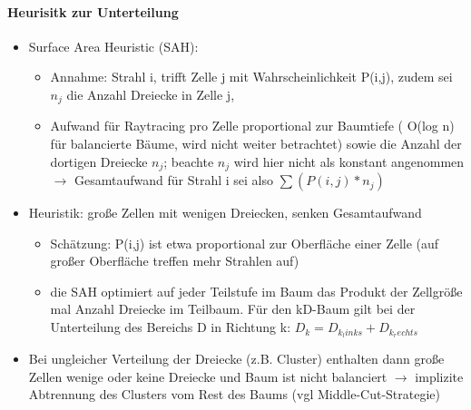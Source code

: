 \documentclass[10pt,landscape]{article}
\begin{document}
\begin{multicols}{3}
\paragraph*{Heurisitk zur Unterteilung}
\begin{itemize}
  \item Surface Area Heuristic (SAH):
        \begin{itemize}
          \item Annahme: Strahl i, trifft Zelle j mit Wahrscheinlichkeit P(i,j), zudem sei $n_j$ die Anzahl Dreiecke in Zelle j,
          \item Aufwand für Raytracing pro Zelle proportional zur Baumtiefe ( O(log n) für balancierte Bäume, wird nicht weiter betrachtet) sowie die Anzahl der dortigen Dreiecke $n_j$; beachte $n_j$ wird hier nicht als konstant angenommen $\rightarrow$ Gesamtaufwand für Strahl i sei also $\sum(P(i,j)*n_j)$
        \end{itemize}
  \item Heuristik: große Zellen mit wenigen Dreiecken, senken Gesamtaufwand
        \begin{itemize}
          \item Schätzung: P(i,j) ist etwa proportional zur Oberfläche einer Zelle (auf großer Oberfläche treffen mehr Strahlen auf)
          \item die SAH optimiert auf jeder Teilstufe im Baum das Produkt der Zellgröße mal Anzahl Dreiecke im Teilbaum. Für den kD-Baum gilt bei der Unterteilung des Bereichs D in Richtung k: $D_k = D_{k_links} + D_{k_rechts}$
        \end{itemize}
  \item Bei ungleicher Verteilung der Dreiecke (z.B. Cluster) enthalten dann große Zellen wenige oder keine Dreiecke und Baum ist nicht balanciert $\rightarrow$ implizite Abtrennung des Clusters vom Rest des Baums (vgl Middle-Cut-Strategie)
\end{itemize}


\end{multicols}
\end{document}

